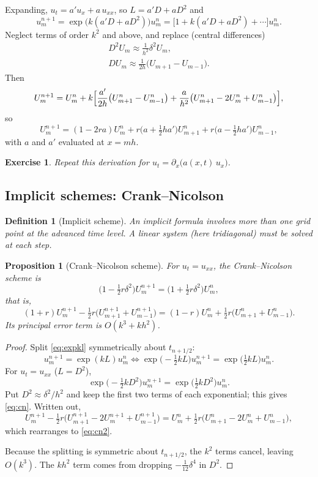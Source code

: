 \documentclass[11pt,a4paper]{article}
\numberwithin{equation}{section}
\theoremstyle{spacedplain}
\newtheorem{proposition}[theorem]{Proposition}
\theoremstyle{spaceddefinition}
\newtheorem{definition}[theorem]{Definition}
\newtheorem{exercise}[theorem]{Exercise}
\theoremstyle{spacedremark}
\begin{document}
Expanding, \(u_t=a'u_x+a\,u_{xx}\), so \(L=a'D+aD^2\) and
\[
  u_m^{n+1}=\exp\bigl(k(a'D+aD^2)\bigr)u_m^n
  =\bigl[1+k(a'D+aD^2)+\cdots\bigr]u_m^n.
\]
Neglect terms of order \(k^2\) and above, and replace (central
differences)
\[
\begin{gathered}
  D^2U_m\approx\frac1{h^2}\delta^2U_m,
  \\
  DU_m\approx\frac1{2h}\bigl(U_{m+1}-U_{m-1}\bigr).
\end{gathered}
\]
Then
\[
  U_m^{n+1}=U_m^n+k\Bigl[\frac{a'}{2h}\bigl(U_{m+1}^n-U_{m-1}^n\bigr)
  +\frac{a}{h^2}\bigl(U_{m+1}^n-2U_m^n+U_{m-1}^n\bigr)\Bigr],
\]
so
\[
  \boxed{U_m^{n+1}=(1-2ra)U_m^n+r\bigl(a+\tfrac12ha'\bigr)U_{m+1}^n
  +r\bigl(a-\tfrac12ha'\bigr)U_{m-1}^n},
\]
with \(a\) and \(a'\) evaluated at \(x=mh\).

\begin{exercise}
Repeat this derivation for \(u_t=\partial_x\bigl(a(x,t)\,u_x\bigr)\).
\end{exercise}

\subsection{Implicit schemes: Crank--Nicolson}

\begin{definition}[Implicit scheme]
An implicit formula involves \emph{more than one} grid point at the
advanced time level.  A linear system (here tridiagonal) must be
solved at each step.
\end{definition}

\begin{proposition}[Crank--Nicolson scheme]\label{prop:cn}
For \(u_t=u_{xx}\), the Crank--Nicolson scheme is
\begin{equation}\label{eq:cn}
  \boxed{\bigl(1-\tfrac12r\delta^2\bigr)U_m^{n+1}
  =\bigl(1+\tfrac12r\delta^2\bigr)U_m^n},
\end{equation}
that is,
\begin{equation}\label{eq:cn2}
  (1+r)U_m^{n+1}-\tfrac12r\bigl(U_{m+1}^{n+1}+U_{m-1}^{n+1}\bigr)
  =(1-r)U_m^n+\tfrac12r\bigl(U_{m+1}^n+U_{m-1}^n\bigr).
\end{equation}
Its principal error term is \(O(k^3+kh^2)\).
\end{proposition}

\begin{proof}
Split \eqref{eq:expkl} symmetrically about \(t_{n+1/2}\):
\[
  u_m^{n+1}=\exp(kL)u_m^n
  \iff
  \exp\bigl(-\tfrac12kL\bigr)u_m^{n+1}=\exp\bigl(\tfrac12kL\bigr)u_m^n.
\]
For \(u_t=u_{xx}\) (\(L=D^2\)),
\[
  \exp\bigl(-\tfrac12kD^2\bigr)u_m^{n+1}=\exp\bigl(\tfrac12kD^2\bigr)u_m^n.
\]
Put \(D^2\approx\delta^2/h^2\) and keep the first two terms of each
exponential; this gives \eqref{eq:cn}.  Written out,
\[
  U_m^{n+1}-\tfrac12r\bigl(U_{m+1}^{n+1}-2U_m^{n+1}+U_{m-1}^{n+1}\bigr)
  =U_m^n+\tfrac12r\bigl(U_{m+1}^n-2U_m^n+U_{m-1}^n\bigr),
\]
which rearranges to \eqref{eq:cn2}.

Because the splitting is symmetric about \(t_{n+1/2}\), the \(k^2\)
terms cancel, leaving \(O(k^3)\).  The \(kh^2\) term comes from
dropping \(-\frac1{12}\delta^4\) in \(D^2\).
\end{proof}
\end{document}
